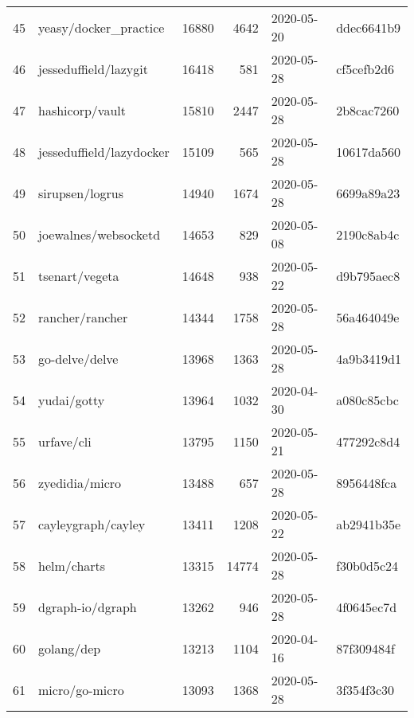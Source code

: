 \begin{footnotesize}
\begin{longtable}{llrrll}
        45  &                              yeasy/docker\_practice &  16880 &   4642 & 2020-05-20 &  ddec6641b9 \\
        46  &                              jesseduffield/lazygit &  16418 &    581 & 2020-05-28 &  cf5cefb2d6 \\
        47  &                                    hashicorp/vault &  15810 &   2447 & 2020-05-28 &  2b8cac7260 \\
        48  &                           jesseduffield/lazydocker &  15109 &    565 & 2020-05-28 &  10617da560 \\
        49  &                                    sirupsen/logrus &  14940 &   1674 & 2020-05-28 &  6699a89a23 \\
        50  &                               joewalnes/websocketd &  14653 &    829 & 2020-05-08 &  2190c8ab4c \\
        51  &                                     tsenart/vegeta &  14648 &    938 & 2020-05-22 &  d9b795aec8 \\
        52  &                                    rancher/rancher &  14344 &   1758 & 2020-05-28 &  56a464049e \\
        53  &                                     go-delve/delve &  13968 &   1363 & 2020-05-28 &  4a9b3419d1 \\
        54  &                                        yudai/gotty &  13964 &   1032 & 2020-04-30 &  a080c85cbc \\
        55  &                                         urfave/cli &  13795 &   1150 & 2020-05-21 &  477292c8d4 \\
        56  &                                     zyedidia/micro &  13488 &    657 & 2020-05-28 &  8956448fca \\
        57  &                                 cayleygraph/cayley &  13411 &   1208 & 2020-05-22 &  ab2941b35e \\
        58  &                                        helm/charts &  13315 &  14774 & 2020-05-28 &  f30b0d5c24 \\
        59  &                                   dgraph-io/dgraph &  13262 &    946 & 2020-05-28 &  4f0645ec7d \\
        60  &                                         golang/dep &  13213 &   1104 & 2020-04-16 &  87f309484f \\
        61  &                                     micro/go-micro &  13093 &   1368 & 2020-05-28 &  3f354f3c30 \\

\end{longtable}
\end{footnotesize}

